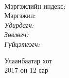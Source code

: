\begin{titlepage}
\begin{center}

{\scshape\LARGE \univname\par} %
{\scshape\Large \facname\par}\vspace{0.5cm} %

\vspace{2cm}
\hfill \large{\deptname} \\

\vspace{2cm}

{\huge \bfseries \ttitle\par}\vspace{0.4cm} %

\vspace{2cm}

\begin{minipage}[t] {0.9\textwidth}
\begin{flushleft} 
\normalsize

Мэргэжлийн индекс: \degreeid \\
Мэргэжил: \degreename \\[2cm]

\emph{Удирдагч:} {\supname} \\%
\emph{Зөвлөгч:} {\advicename} \\ %
\emph{Гүйцэтгэгч:} {\shortname} \\ %

\end{flushleft}
\end{minipage}

\vfill

\large {Улаанбаатар хот} \\
{\large 2017 он 12 сар}\\ %

\end{center}
\end{titlepage}

 